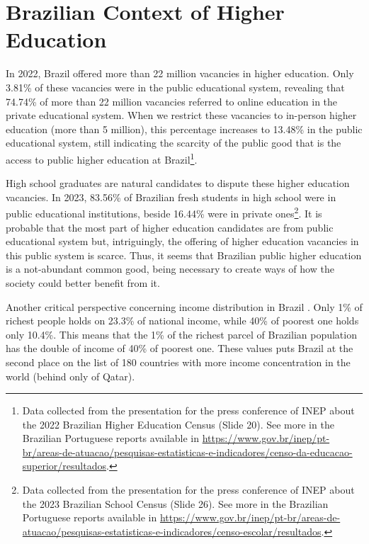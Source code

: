 \section{Brazilian Context of Higher Education}
\label{equity-sec:br-context}

In 2022, Brazil offered more than 22 million vacancies in higher education. Only 3.81\% of these vacancies were in the public educational system, revealing that 74.74\% of more than 22 million vacancies referred to online education in the private educational system. When we restrict these vacancies to in-person higher education (more than 5 million), this percentage increases to 13.48\% in the public educational system, still indicating the scarcity of the public good that is the access to public higher education at Brazil\footnote{Data collected from the presentation for the press conference of \gls{INEP} about the 2022 Brazilian Higher Education Census (Slide 20). See more in the Brazilian Portuguese reports available in \url{https://www.gov.br/inep/pt-br/areas-de-atuacao/pesquisas-estatisticas-e-indicadores/censo-da-educacao-superior/resultados}.}.

High school graduates are natural candidates to dispute these higher education vacancies. In 2023, 83.56\% of Brazilian fresh students in high school were in public educational institutions, beside 16.44\% were in private ones\footnote{Data collected from the presentation for the press conference of \gls{INEP} about the 2023 Brazilian School Census (Slide 26). See more in the Brazilian Portuguese reports available in \url{https://www.gov.br/inep/pt-br/areas-de-atuacao/pesquisas-estatisticas-e-indicadores/censo-escolar/resultados}.}. It is probable that the most part of higher education candidates are from public educational system but, intriguingly, the offering of higher education vacancies in this public system is scarce. Thus, it seems that Brazilian public higher education is a not-abundant common good, being necessary to create ways of how the society could better benefit from it.

Another critical perspective concerning income distribution in Brazil \cite{sasse:2021}. Only 1\% of richest people holds on 23.3\% of national income, while 40\% of poorest one holds only 10.4\%. This means that the 1\% of  the richest parcel of Brazilian population has the double of income of 40\% of poorest one. These values puts Brazil at the second place on the list of 180 countries with more income concentration in the world (behind only of Qatar).

